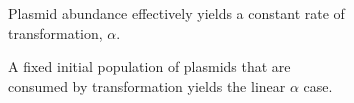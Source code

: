 \documentclass[numbib]{buthesis_p}  %
\begin{document}
\begin{figure}[h]
\centering
\begin{subfigure}{0.3\linewidth} \centering
 \caption{Plasmid abundance effectively yields a constant rate of transformation, $\alpha$.}
 \label{fig:const}
\end{subfigure}
\hspace{1ex} \vrule \hspace{1ex}
\begin{subfigure}{0.3\linewidth} \centering
 \caption{A fixed initial population of plasmids that are consumed by transformation
 yields the linear $\alpha$ case.}
 \label{fig:linear}
\end{subfigure}
\hspace{1ex} \vrule \hspace{1ex}
\begin{subfigure}{0.3\linewidth} \centering

\end{subfigure}
\end{figure}
\end{document}

